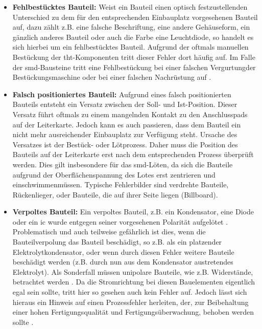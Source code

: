         \begin{itemize}
            \item \textbf{Fehlbestücktes Bauteil:} Weist ein Bauteil einen optisch festzustellenden Unterschied zu dem für den entsprechenden Einbauplatz vorgesehenen Bauteil auf, dazu zählt z.B. eine falsche Beschriftung, eine andere Gehäuseform, ein gänzlich anderes Bauteil oder auch die Farbe eine Leuchtdiode, so handelt es sich hierbei um ein fehlbestücktes Bauteil. Aufgrund der oftmals manuellen Bestückung der \ac{tht}-Komponenten tritt dieser Fehler dort häufig auf. \cite{berger_test-_2012} Im Falle der \ac{smd}-Bausteine tritt eine Fehlbestückung bei einer falschen \glqq Vergurtung\grqq\@ der Bestückungsmaschine oder bei einer falschen Nachrüstung auf \cite{stiny_fertigung_2010}.
            \item \textbf{Falsch positioniertes Bauteil:} Aufgrund eines falsch positionierten Bauteils entsteht ein Versatz zwischen der Soll- und Ist-Position. Dieser Versatz führt oftmals zu einem mangelnden Kontakt zu den Anschlusspads auf der Leiterkarte. Jedoch kann es auch passieren, dass dem Bauteil ein nicht mehr ausreichender Einbauplatz zur Verfügung steht. Ursache des Versatzes ist der Bestück- oder Lötprozess. Daher muss die Position des Bauteils auf der Leiterkarte erst nach dem entsprechenden Prozess überprüft werden. Dies gilt insbesondere für das \ac{smd}-Löten, da sich die Bauteile aufgrund der Oberflächenspannung des Lotes erst zentrieren und \glqq einschwimmen\grqq\@ müssen. Typische Fehlerbilder sind verdrehte Bauteile, Rückenlieger, oder Bauteile, die auf ihrer Seite liegen (Billboard). \cite{berger_test-_2012}  
            \item \textbf{Verpoltes Bauteil:} Ein verpoltes Bauteil, z.B. ein Kondensator, eine Diode oder ein \ac{ic} wurde entgegen seiner vorgesehenen Polarität aufgelötet \cite{berger_test-_2012}. Problematisch und auch teilweise gefährlich ist dies, wenn die Bauteilverpolung das Bauteil beschädigt, so z.B. als ein platzender Elektrolytkondensator, oder wenn durch diesen Fehler weitere Bauteile beschädigt werden (z.B. durch nun aus dem Kondensator austretendes Elektrolyt). Als Sonderfall müssen unipolare Bauteile, wie z.B. Widerstände, betrachtet werden \cite{berger_test-_2012}. Da die Stromrichtung bei diesen Bauelementen eigentlich egal sein sollte, tritt hier so gesehen auch kein Fehler auf. Jedoch lässt sich hieraus ein Hinweis auf einen Prozessfehler herleiten, der, zur Beibehaltung einer hohen Fertigungsqualität und Fertigungsüberwachung, behoben werden sollte \cite{berger_test-_2012}.

\end{itemize}

